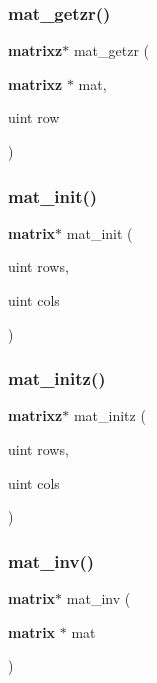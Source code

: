 \mbox{\label{mat_lib_8h_ab4a1231061c4a5b62149b8a394ed8d11}} 
\subsubsection{mat\+\_\+getzr()}
{\footnotesize\ttfamily \textbf{ matrixz}$\ast$ mat\+\_\+getzr (\begin{DoxyParamCaption}\item[{\textbf{ matrixz} $\ast$}]{mat,  }\item[{uint}]{row }\end{DoxyParamCaption})}

\mbox{\label{mat_lib_8h_aab2cc08de4d772813f5249ddbac7d538}} 
\subsubsection{mat\+\_\+init()}
{\footnotesize\ttfamily \textbf{ matrix}$\ast$ mat\+\_\+init (\begin{DoxyParamCaption}\item[{uint}]{rows,  }\item[{uint}]{cols }\end{DoxyParamCaption})}

\mbox{\label{mat_lib_8h_a831b1fcac2b201cbdd5ac0a8a3c1dd1d}} 
\subsubsection{mat\+\_\+initz()}
{\footnotesize\ttfamily \textbf{ matrixz}$\ast$ mat\+\_\+initz (\begin{DoxyParamCaption}\item[{uint}]{rows,  }\item[{uint}]{cols }\end{DoxyParamCaption})}

\mbox{\label{mat_lib_8h_a1b2d39e79b157beadf2a416f018cd020}} 
\subsubsection{mat\+\_\+inv()}
{\footnotesize\ttfamily \textbf{ matrix}$\ast$ mat\+\_\+inv (\begin{DoxyParamCaption}\item[{\textbf{ matrix} $\ast$}]{mat }\end{DoxyParamCaption})}

